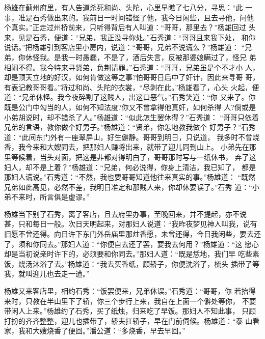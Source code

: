 杨雄在蓟州府里，有人告道杀死和尚、头陀，心里早瞧了七八分，寻思：“此
一事，准是石秀做出来的。我前日一时间错怪了他，我今日闲些，且去寻他，问他
个真实。”正走过州桥前来，只听得背后有人叫道：“哥哥，那里去？”杨雄回过
头来，见是石秀，便道：“兄弟，我正没寻你处。”石秀道：“哥哥且来我下处，
和你说话。”把杨雄引到客店里小房内，说道：“哥哥，兄弟不说谎么？”杨雄道：
“兄弟，你休怪我。是我一时愚蠢，不是了，酒后失言，反被那婆娘瞒过了，怪兄
弟相闹不得。我今特来寻贤弟，负荆请罪。”石秀道：“哥哥，兄弟虽是个不才小
人，却是顶天立地的好汉，如何肯做这等之事?怕哥哥日后中了奸计，因此来寻哥
哥，有表记教哥哥看。”将过和尚、头陀的衣裳，“尽剥在此。”杨雄看了，心头
火起，便道：“兄弟休怪。我今夜碎割了这贱人，出这口恶气。”石秀笑道：“你
又来了。你既是公门中勾当的人，如何不知法度?你又不曾拿得他真奸，如何杀得
人?倘或是小弟胡说时，却不错杀了人。”杨雄道：“似此怎生罢休得？”石秀道：
“哥哥只依着兄弟的言语，教你做个好男子。”杨雄道：“贤弟，你怎地教我做个
好男子？”石秀道：“此间东门外有一座翠屏山，好生僻静。哥哥到明日，只说道，
我多时不曾烧香，我今来和大嫂同去，把那妇人赚将出来，就带了迎儿同到山上。
小弟先在那里等候着，当头对面，把这是非都对得明白了，哥哥那时写与一纸休书，
弃了这妇人，却不是上着？”杨雄道：“兄弟，何必说得，你身上清洁，我已知了，
都是那妇人谎说。”石秀道：“不然，我也要哥哥知道他往来真实的事。”杨雄道：
“既然兄弟如此高见，必然不差，我明日准定和那贱人来，你却休要误了。”石秀
道：“小弟不来时，所言俱是虚谬。”

杨雄当下别了石秀，离了客店，且去府里办事，至晚回来，并不提起，亦不说
甚，只和每日一般。次日天明起来，对那妇人说道：“我昨夜梦见神人叫我，说有
旧愿不曾还得。向日许下东门外岳庙里那炷香愿，未曾还得，今日我闲些，要去还
了，须和你同去。”那妇人道：“你便自去还了罢，要我去何用？”杨雄道：“这
愿心却是当初说亲时许下的，必须要和你同去。”那妇人道：“既是恁地，我们早
吃些素饭，烧汤沐浴了去。”杨雄道：“我去买香纸，顾轿子，你便洗浴了，梳头
插带了等我，就叫迎儿也去走一遭。”

杨雄又来客店里，相约石秀：“饭罢便来，兄弟休误。”石秀道：“哥哥，你
若抬得来时，只教在半山里下了轿，你三个步行上来，我自在上面一个僻处等你，
不要带闲人上来。”杨雄约了石秀，买了纸烛，归来吃了早饭。那妇人不知此事，
只顾打扮的齐齐整整，迎儿也插带了，轿夫扛轿子，早在门前伺候。杨雄道：“泰
山看家，我和大嫂烧香了便回。”潘公道：“多烧香，早去早回。”

